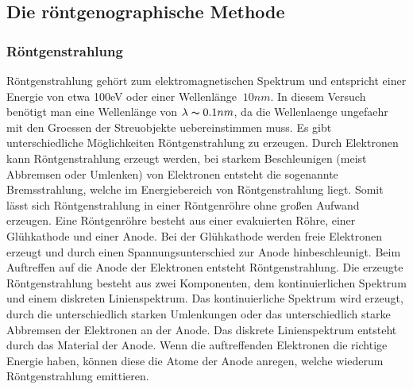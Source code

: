     \subsection{Die röntgenographische Methode}

        \subsubsection{Röntgenstrahlung}    
            Röntgenstrahlung gehört zum elektromagnetischen Spektrum und entspricht einer Energie von etwa
            100eV oder einer Wellenlänge $~10 nm$. In diesem Versuch benötigt man eine Wellenlänge von $\lambda \thicksim 0.1 nm$, da 
            die Wellenlaenge ungefaehr mit den Groessen der Streuobjekte uebereinstimmen muss. Es gibt unterschiedliche Möglichkeiten Röntgenstrahlung zu erzeugen. 
            Durch Elektronen kann Röntgenstrahlung erzeugt werden, bei starkem Beschleunigen (meist Abbremsen oder Umlenken) von Elektronen entsteht die sogenannte Bremsstrahlung, welche im Energiebereich
            von Röntgenstrahlung liegt. Somit lässt sich Röntgenstrahlung in einer Röntgenröhre ohne großen Aufwand erzeugen.
            Eine Röntgenröhre besteht aus einer evakuierten Röhre, einer Glühkathode und einer Anode. Bei der Glühkathode werden
            freie Elektronen erzeugt und durch einen Spannungsunterschied zur Anode hinbeschleunigt. Beim Auftreffen auf die Anode
            der Elektronen entsteht Röntgenstrahlung. Die erzeugte Röntgenstrahlung besteht aus zwei Komponenten, dem kontinuierlichen Spektrum
            und einem diskreten Linienspektrum. Das kontinuierliche Spektrum wird erzeugt, durch die unterschiedlich starken Umlenkungen oder das unterschiedlich starke
            Abbremsen der Elektronen an der Anode.
            Das diskrete Linienspektrum entsteht durch das Material der Anode. Wenn die auftreffenden Elektronen die richtige Energie haben, 
            können diese die Atome der Anode anregen, welche wiederum Röntgenstrahlung emittieren.
